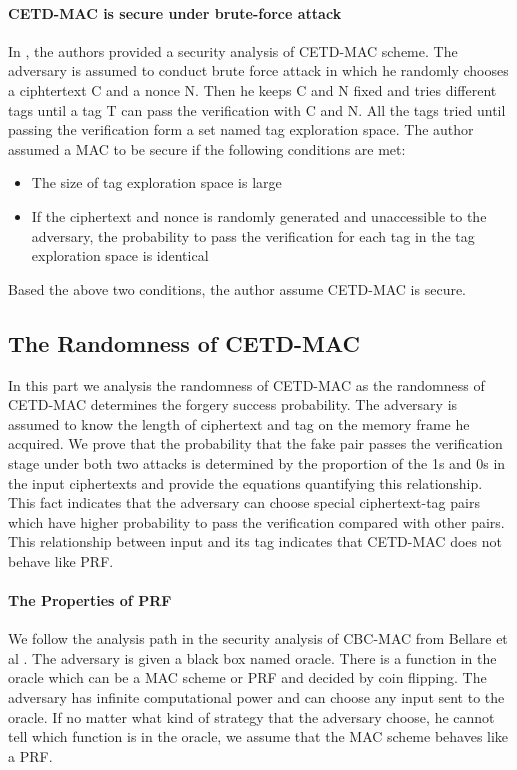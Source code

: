 \paragraph{CETD-MAC is secure under brute-force attack}
In \cite{}, the authors provided a security analysis of CETD-MAC scheme. The adversary is assumed to conduct brute force attack in which he randomly chooses a ciphtertext C and a nonce N. Then he keeps C and N fixed and tries different tags until a tag T can pass the verification with C and N. All the tags tried until passing the verification form a set named tag exploration space. The author assumed a MAC to be secure if the following conditions are met:
\begin{itemize}
	\item The size of tag exploration space is large
	\item If the ciphertext and nonce is randomly generated and unaccessible to the adversary, the probability to pass the verification for each tag in the tag exploration space is identical
\end{itemize}
Based the above two conditions, the author assume CETD-MAC is secure.

\subsection{The Randomness of CETD-MAC}\label{sect:proportion}
In this part we analysis the randomness of CETD-MAC as the randomness of CETD-MAC determines the forgery success probability. 
The adversary is assumed to know the length of ciphertext and tag on the memory frame he acquired. 
We prove that the probability that the fake pair passes the verification stage under both two attacks is determined by the proportion of the 1s and 0s in the input ciphertexts and provide the equations quantifying this relationship. This fact indicates that the adversary can choose special ciphertext-tag pairs which have higher probability to pass the verification compared with other pairs. This relationship between input and its tag indicates that CETD-MAC does not behave like PRF.  
 
\paragraph{The Properties of PRF}
We follow the analysis path in the security analysis of CBC-MAC from Bellare et
al \cite{}. The adversary is given a black box named oracle. There is a function
in the oracle which can be a MAC scheme or PRF and decided by coin flipping. The adversary has infinite
computational power and can choose any input sent to the oracle. If no matter
what kind of strategy that the adversary choose, he cannot tell which function
is in the oracle, we assume that the MAC scheme behaves like a PRF.  

